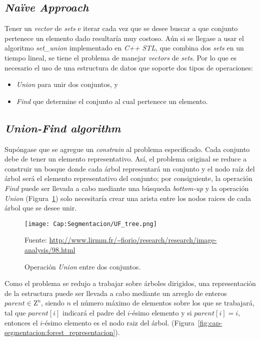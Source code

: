 \subsection{\textit{Naïve Approach}}
Tener un \textit{vector} de \textit{sets} e iterar cada vez que se desee
buscar a que conjunto pertenece un elemento dado resultaría muy costoso. Aún 
si se llegase a usar el algoritmo \textit{set\_union} implementado en 
\textit{C++ STL}, que combina dos \textit{sets} en un tiempo lineal, se tiene 
el problema de manejar \textit{vectors} de \textit{sets}. Por lo que es 
necesario el uso de una estructura de datos que soporte dos tipos de 
operaciones:
\begin{itemize}
	\item \textit{Union} para unir dos conjuntos, y
	\item \textit{Find} que determine el conjunto al cual pertenece un elemento.
\end{itemize}

\subsection{\textit{Union-Find algorithm}}
Supóngase que se agregue un \textit{constrain} al problema especificado. Cada
conjunto debe de tener un elemento representativo. 
Así, el problema original se reduce a construir un bosque donde cada árbol 
representará un conjunto y el nodo raíz del árbol será el elemento 
representativo del conjunto; por consiguiente, la operación \textit{Find} 
puede ser llevada a cabo mediante una búsqueda \textit{bottom-up} y la 
operación \textit{Union} (Figura~\ref{fig:cap-segmentacion:UF_tree}) solo 
necesitaría crear una arista entre los nodos raices de cada árbol que se
desee unir.\cite{Wayne:2011:Alg}

\begin{figure}[h!]
	\centering
	\texttt{[image: Cap:Segmentacion/UF\_tree.png]}
	\caption{Operación \textit{Union} entre dos conjuntos.}\tiny{Fuente: 
	\url{http://www.lirmm.fr/~fiorio/research/research/image-analysis/98.html}}
	\label{fig:cap-segmentacion:UF_tree}
\end{figure}

Como el problema se redujo a trabajar sobre árboles dirigidos, una 
representación de la estructura puede ser llevada a cabo mediante un arreglo
de enteros $parent \in \mathrm{Z}^n$, siendo $n$ el número máximo de elementos
sobre los que se trabajará, tal que $parent[i]$ indicará el padre del 
$i$-ésimo elemento y  si $parent[i] = i$, entonces el $i$-ésimo elemento es el
nodo raiz del árbol. 
(Figura~\ref{fig:cap-segmentacion:forest_representacion}).

